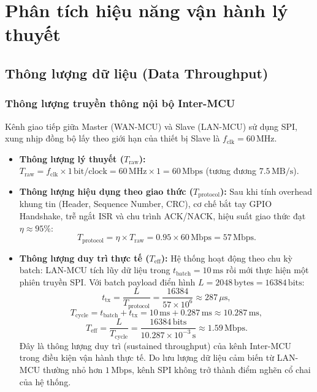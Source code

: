 \section{Phân tích hiệu năng vận hành lý thuyết}

\subsection{Thông lượng dữ liệu (Data Throughput)}

\subsubsection{Thông lượng truyền thông nội bộ Inter-MCU}
Kênh giao tiếp giữa Master (WAN-MCU) và Slave (LAN-MCU) sử dụng SPI, xung nhịp đồng bộ lấy theo giới hạn của thiết bị Slave là $f_{\text{clk}} = 60\,\text{MHz}$.
\begin{itemize}
    \item \textbf{Thông lượng lý thuyết ($T_{\text{raw}}$):}
    $T_{\text{raw}} = f_{\text{clk}} \times 1\,\text{bit/clock} = 60\,\text{MHz} \times 1 = 60\,\text{Mbps}$
    (tương đương $7{.}5\,\text{MB/s}$).

    \item \textbf{Thông lượng hiệu dụng theo giao thức ($T_{\text{protocol}}$):}
    Sau khi tính overhead khung tin (Header, Sequence Number, CRC), cơ chế bắt tay GPIO Handshake, trễ ngắt ISR và chu trình ACK/NACK, hiệu suất giao thức đạt $\eta \approx 95\%$:
    \[
        T_{\text{protocol}} = \eta \times T_{\text{raw}} = 0{.}95 \times 60\,\text{Mbps} = 57\,\text{Mbps}.
    \]

    \item \textbf{Thông lượng duy trì thực tế ($T_{\text{eff}}$):}
    Hệ thống hoạt động theo chu kỳ batch: LAN-MCU tích lũy dữ liệu trong $t_{\text{batch}} = 10\,\text{ms}$ rồi mới thực hiện một phiên truyền SPI. Với batch payload điển hình $L = 2048\,\text{bytes} = 16384\,\text{bits}$:
    \[
        t_{\text{tx}} = \frac{L}{T_{\text{protocol}}} = \frac{16384}{57 \times 10^{6}} \approx 287\,\mu\text{s},
    \]
    \[
        T_{\text{cycle}} = t_{\text{batch}} + t_{\text{tx}} = 10\,\text{ms} + 0{.}287\,\text{ms} \approx 10{.}287\,\text{ms},
    \]
    \[
        T_{\text{eff}} = \frac{L}{T_{\text{cycle}}} = \frac{16384\,\text{bits}}{10{.}287 \times 10^{-3}\,\text{s}} \approx 1{.}59\,\text{Mbps}.
    \]
    Đây là thông lượng duy trì (sustained throughput) của kênh Inter-MCU trong điều kiện vận hành thực tế. Do lưu lượng dữ liệu cảm biến từ LAN-MCU thường nhỏ hơn $1\,\text{Mbps}$, kênh SPI không trở thành điểm nghẽn cổ chai của hệ thống.
\end{itemize}

